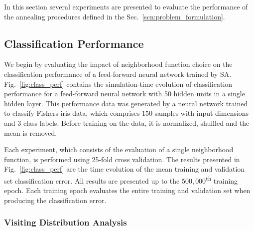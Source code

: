 \documentclass[11pt]{afthesis}
\begin{document}
	
	In this section several experiments are presented to evaluate the performance of the annealing procedures defined in the Sec.~\ref{scn:problem_formulation}.
	
	
	\subsection{Classification Performance}
	
	We begin by evaluating the impact of neighborhood function choice on the classification performance of a feed-forward neural network trained by SA. Fig.~\ref{fig:class_perf} contains the simulation-time evolution of classification performance for a feed-forward neural network with 50 hidden units in a single hidden layer. This performance data was generated by a neural network trained to classify Fishers iris data, which comprises $150$ samples with input dimensions and $3$ class labels. Before training on the data, it is normalized, shuffled and the mean is removed.
	
	Each experiment, which consists of the evaluation of a single neighborhood function, is performed using 25-fold cross validation. The results presented in Fig.~\ref{fig:class_perf} are the time evolution of the mean training and validation set classification error. All results are presented up to the $500,000$\textsuperscript{th} training epoch. Each training epoch evaluates the entire training and validation set when producing the classification error.
	
	
	\subsubsection{Visiting Distribution Analysis}
	
\end{document}
